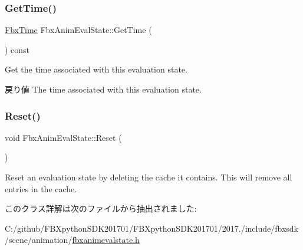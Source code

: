 \subsubsection{\texorpdfstring{Get\+Time()}{GetTime()}}
{\footnotesize\ttfamily \hyperlink{class_fbx_time}{Fbx\+Time} Fbx\+Anim\+Eval\+State\+::\+Get\+Time (\begin{DoxyParamCaption}{ }\end{DoxyParamCaption}) const}

Get the time associated with this evaluation state. \begin{DoxyReturn}{戻り値}
The time associated with this evaluation state. 
\end{DoxyReturn}
\mbox{\label{class_fbx_anim_eval_state_a34be9a999fc7dfa426307b4778a50344}} 
\subsubsection{\texorpdfstring{Reset()}{Reset()}}
{\footnotesize\ttfamily void Fbx\+Anim\+Eval\+State\+::\+Reset (\begin{DoxyParamCaption}{ }\end{DoxyParamCaption})}

Reset an evaluation state by deleting the cache it contains. This will remove all entries in the cache. 

このクラス詳解は次のファイルから抽出されました\+:\begin{DoxyCompactItemize}
\item 
C\+:/github/\+F\+B\+Xpython\+S\+D\+K201701/\+F\+B\+Xpython\+S\+D\+K201701/2017./include/fbxsdk/scene/animation/\hyperlink{fbxanimevalstate_8h}{fbxanimevalstate.\+h}\end{DoxyCompactItemize}
